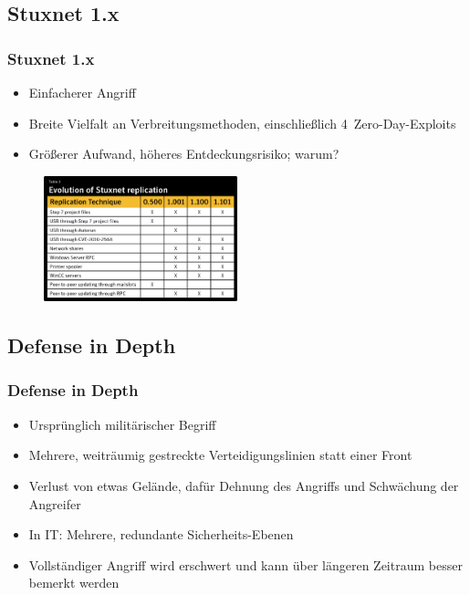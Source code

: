 \documentclass{beamer}
\begin{document}
\subsection{Stuxnet 1.x}

\begin{frame}
  \frametitle{Stuxnet 1.x}
  \begin{itemize}
    \item Einfacherer Angriff
    \item Breite Vielfalt an Verbreitungsmethoden, einschließlich 4~Zero-Day-Exploits
    \item Größerer Aufwand, höheres Entdeckungsrisiko; warum?
  \end{itemize}
  \begin{figure}[p]
    \centering
    \includegraphics[width=0.5\textwidth]{../Evolution_replication.png}
  \end{figure}
\end{frame}

\subsection{Defense in Depth}

\begin{frame}
  \frametitle{Defense in Depth}
  \begin{itemize}
    \item Ursprünglich militärischer Begriff
    \item Mehrere, weiträumig gestreckte Verteidigungslinien statt einer Front
    \item Verlust von etwas Gelände, dafür Dehnung des Angriffs und Schwächung der Angreifer
    \item In IT: Mehrere, redundante Sicherheits-Ebenen
    \item Vollständiger Angriff wird erschwert und kann über längeren Zeitraum besser bemerkt werden
  \end{itemize}
\end{frame}
\end{document}
